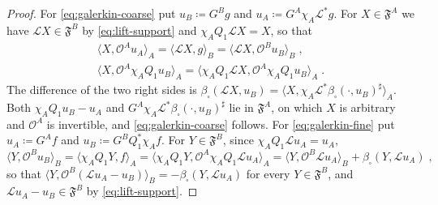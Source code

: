 \documentclass[11pt]{preprint}
\numberwithin{equation}{section}
\theoremstyle{definition}
\theoremstyle{remark}
\theoremstyle{plain}
\begin{document}
\begin{proof}
For \eqref{eq:galerkin-coarse} put $u_B \coloneqq G^Bg$ and $u_A \coloneqq G^A\chi_A\mathcal L^*g$. For $X \in \mathfrak F^A$ we have $\mathcal LX \in \mathfrak F^B$ by \eqref{eq:lift-support} and $\chi_AQ_1\mathcal LX = X$, so that
\begin{equation}\label{eq:galerkin-coarse-proof}
\begin{gathered}
    \langle X, \mathcal O^Au_A\rangle_A = \langle\mathcal LX, g\rangle_B = \langle\mathcal LX, \mathcal O^Bu_B\rangle_B\;,\\
    \langle X, \mathcal O^A\chi_AQ_1u_B\rangle_A = \langle\chi_AQ_1\mathcal LX, \mathcal O^A\chi_AQ_1u_B\rangle_A\;.
\end{gathered}
\end{equation}
The difference of the two right sides is $\beta_\square(\mathcal LX, u_B) = \langle X, \chi_A\mathcal L^*\beta_\square(\cdot, u_B)^\sharp\rangle_A$. Both $\chi_AQ_1u_B - u_A$ and $G^A\chi_A\mathcal L^*\beta_\square(\cdot, u_B)^\sharp$ lie in $\mathfrak F^A$, on which $X$ is arbitrary and $\mathcal O^A$ is invertible, and \eqref{eq:galerkin-coarse} follows. For \eqref{eq:galerkin-fine} put $u_A \coloneqq G^Af$ and $u_B \coloneqq G^BQ_1^*\chi_Af$. For $Y \in \mathfrak F^B$, since $\chi_AQ_1\mathcal Lu_A = u_A$,
\begin{equation}\label{eq:galerkin-fine-proof}
    \langle Y, \mathcal O^Bu_B\rangle_B = \langle\chi_AQ_1Y, f\rangle_A = \langle\chi_AQ_1Y, \mathcal O^A\chi_AQ_1\mathcal Lu_A\rangle_A = \langle Y, \mathcal O^B\mathcal Lu_A\rangle_B + \beta_\square(Y, \mathcal Lu_A)\;,
\end{equation}
so that $\langle Y, \mathcal O^B(\mathcal Lu_A - u_B)\rangle_B = -\beta_\square(Y, \mathcal Lu_A)$ for every $Y \in \mathfrak F^B$, and $\mathcal Lu_A - u_B \in \mathfrak F^B$ by \eqref{eq:lift-support}.
\end{proof}
\end{document}
